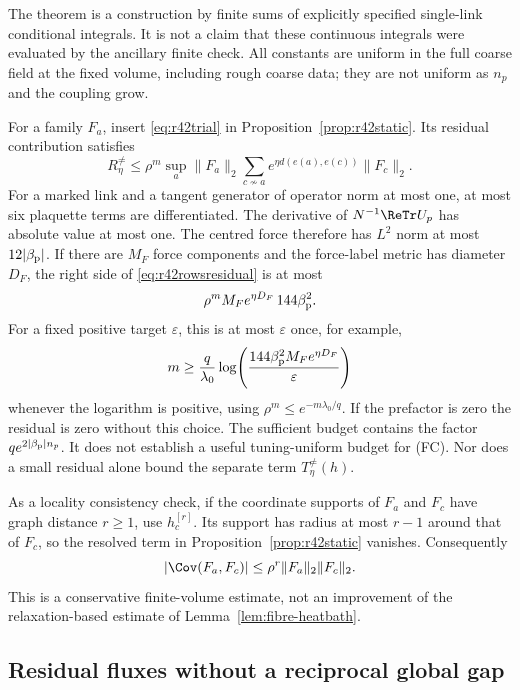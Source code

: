 The theorem is a construction by finite sums of explicitly specified
single-link conditional integrals. It is not a claim that these
continuous integrals were evaluated by the ancillary finite check.
All constants are uniform in the full coarse field at the fixed
volume, including rough coarse data; they are not uniform as $n_p$
and the coupling grow.

For a family $F_a$, insert \eqref{eq:r42trial} in
Proposition~\ref{prop:r42static}. Its residual contribution satisfies
\begin{equation}\label{eq:r42rowsresidual}
 R_\eta^{\ne}\le\rho^m\sup_a\|F_a\|_2
   \sum_{c\not\sim a}e^{\eta d(e(a),e(c))}\|F_c\|_2.
\end{equation}
For a marked link and a tangent generator of operator norm at most
one, at most six plaquette terms are differentiated. The derivative
of $N^{-1}\ReTr U_p$ has absolute value at most one. The centred force
therefore has $L^2$ norm at most $12|\beta_{\rm p}|$.
If there are $M_F$ force components and the force-label metric has
diameter $D_F$, the right side of \eqref{eq:r42rowsresidual} is at most
\begin{equation}\label{eq:r42explicitrowerror}
 \rho^m M_F e^{\eta D_F}\,144\beta_{\rm p}^2.
\end{equation}
For a fixed positive target $\varepsilon$, this is at most
$\varepsilon$ once, for example,
\[
 m\ge\frac q{\lambda_0}
     \log\!\left(\frac{144\beta_{\rm p}^2M_Fe^{\eta D_F}}
                        {\varepsilon}\right)
\]
whenever the logarithm is positive, using $\rho^m\le e^{-m\lambda_0/q}$.
If the prefactor is zero the residual is zero without this choice.
The sufficient budget contains the factor
$q e^{2|\beta_{\rm p}|n_p}$. It does not establish
a useful tuning-uniform budget for (FC). Nor does a small residual
alone bound the separate term $T_\eta^{\ne}(h)$.

As a locality consistency check, if the coordinate supports of $F_a$
and $F_c$ have graph distance $r\ge1$, use $h_c^{[r]}$. Its support
has radius at most $r-1$ around that of $F_c$, so the resolved term
in Proposition~\ref{prop:r42static} vanishes. Consequently
\[
 |\Cov(F_a,F_c)|\le\rho^r\|F_a\|_2\|F_c\|_2.
\]
This is a conservative finite-volume estimate, not an improvement of
the relaxation-based estimate of Lemma~\ref{lem:fibre-heatbath}.

\subsection{Residual fluxes without a reciprocal global gap}
\label{ssec:r42flux}

